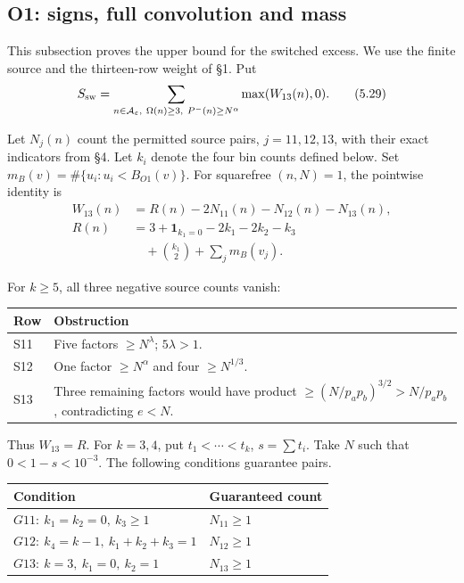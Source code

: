 \subsection{O1: signs, full convolution and mass}

This subsection proves the upper bound for the switched excess.
We use the finite source and the thirteen-row weight of \S{}1.
Put
\[
 S_{\rm sw}=\sum_{n\in\mathcal A_\varepsilon,\ \Omega(n)\ge3,\ P^-(n)\ge N^\alpha}
                   \max(W_{13}(n),0).
\tag{5.29}
\]

Let $N_j(n)$ count the permitted source pairs, $j=11,12,13$,
with their exact indicators from \S{}4.
Let $k_i$ denote the four bin counts defined below.
Set $m_B(v)=\#\{u_i:u_i<B_{O1}(v)\}$.
For squarefree $(n,N)=1$, the pointwise identity is
\begingroup\small
\[
\begin{aligned}
 W_{13}(n)&=R(n)-2N_{11}(n)-N_{12}(n)-N_{13}(n),\\
 R(n)&=3+\mathbf1_{k_1=0}-2k_1-2k_2-k_3\\
      &\quad+\binom{k_1}{2}+\sum_jm_B(v_j).
\end{aligned}
\tag{5.29a}
\]

\endgroup
For $k\ge5$, all three negative source counts vanish:
\begin{center}
\begin{tabular}{@{}lp{}@{}}
\toprule
Row & Obstruction \\
\midrule
S11 & Five factors $\ge N^\lambda$; $5\lambda>1$. \\
S12 & One factor $\ge N^\alpha$ and four $\ge N^{1/3}$. \\
S13 & Three remaining factors would have product $\ge(N/p_ap_b)^{3/2}>N/p_ap_b$, contradicting $e<N$. \\
\bottomrule
\end{tabular}
\end{center}
Thus $W_{13}=R$.
For $k=3,4$, put $t_1<\cdots<t_k$, $s=\sum t_i$.
Take $N$ such that $0<1-s<10^{-3}$.
The following conditions guarantee pairs.
\begin{longtable}{@{}p{}p{}@{}}
\toprule
Condition & Guaranteed count \\
\midrule
$G11:\ k_1=k_2=0,\ k_3\ge1$ & $N_{11}\ge1$ \\
$G12:\ k_4=k-1,\ k_1+k_2+k_3=1$ & $N_{12}\ge1$ \\
$G13:\ k=3,\ k_1=0,\ k_2=1$ & $N_{13}\ge1$ \\
\bottomrule
\end{longtable}

